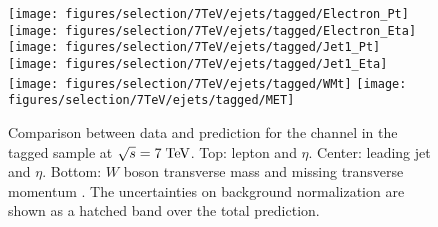 %                                      
\begin{figure}
\centering
\texttt{[image: figures/selection/7TeV/ejets/tagged/Electron\_Pt]}
\texttt{[image: figures/selection/7TeV/ejets/tagged/Electron\_Eta]}
\texttt{[image: figures/selection/7TeV/ejets/tagged/Jet1\_Pt]}
\texttt{[image: figures/selection/7TeV/ejets/tagged/Jet1\_Eta]}
\texttt{[image: figures/selection/7TeV/ejets/tagged/WMt]}
\texttt{[image: figures/selection/7TeV/ejets/tagged/MET]}
\caption{
    Comparison between data and prediction for the \ejets{}
    channel in the tagged sample at $\sqrt{s} = 7 \; \mathrm{TeV}{}$. Top: lepton \pt{} and
    $\eta$. Center: leading jet \pt{} and $\eta$. Bottom: $W$ boson
    transverse mass \mtw{} and missing transverse momentum \met{}.
    The uncertainties on background normalization are shown as a
    hatched band over the total prediction.
  }
\label{fig:2011ele_tagged}
\end{figure}


